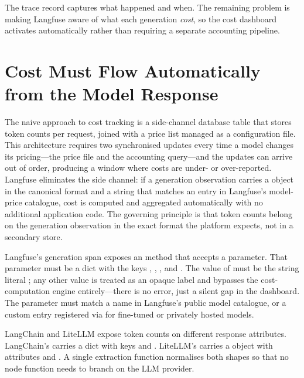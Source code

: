 The trace record captures what happened and when. The remaining problem
is making Langfuse aware of what each generation \emph{cost}, so the
cost dashboard activates automatically rather than requiring a separate
accounting pipeline.


\section{Cost Must Flow Automatically from the Model Response}
\label{sec:obs-cost-tracking}

The naive approach to cost tracking is a side-channel database table
that stores token counts per request, joined with a price list managed
as a configuration file. This architecture requires two synchronised
updates every time a model changes its pricing---the price file and the
accounting query---and the updates can arrive out of order, producing
a window where costs are under- or over-reported. Langfuse eliminates
the side channel: if a generation observation carries a 
object in the canonical format and a  string that matches
an entry in Langfuse's model-price catalogue, cost is computed and
aggregated automatically with no additional application code. The
governing principle is that token counts belong on the generation
observation in the exact format the platform expects, not in a
secondary store.

Langfuse's generation span exposes an  method that
accepts a  parameter. That parameter must be a dict with
the keys , , , and
. The value of  must be the string literal
; any other value is treated as an opaque label and
bypasses the cost-computation engine entirely---there is no error, just
a silent gap in the dashboard. The  parameter must match a
name in Langfuse's public model catalogue, or a custom entry registered
via  for fine-tuned or privately hosted
models.

LangChain and LiteLLM expose token counts on different response
attributes. LangChain's  carries a 
dict with keys  and .
LiteLLM's  carries a  object with
attributes  and . A
single extraction function normalises both shapes so that no node
function needs to branch on the LLM provider.


